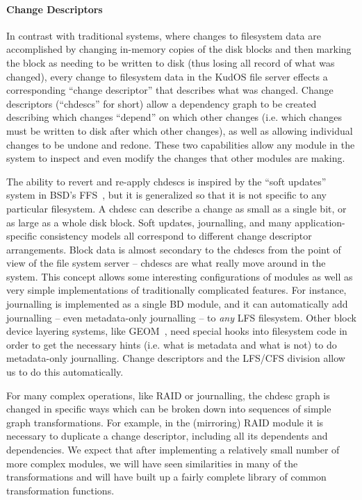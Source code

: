 \preparagraphspacing{}
\paragraph{Change Descriptors}
\label{sec:chdescs}

In contrast with traditional systems, where changes to filesystem data are
accomplished by changing in-memory copies of the disk blocks and then marking
the block as needing to be written to disk (thus losing all record of what was
changed), every change to filesystem data in the KudOS file server effects a
corresponding ``change descriptor'' that describes what was changed. Change
descriptors (``chdescs'' for short) allow a dependency graph to be created
describing which changes ``depend'' on which other changes (i.e. which changes
must be written to disk after which other changes), as well as allowing
individual changes to be undone and redone. These two capabilities allow any
module in the system to inspect and even modify the changes that other modules
are making.

The ability to revert and re-apply chdescs is inspired by the ``soft updates''
system in BSD's FFS~\cite{ganger00soft}, but it is generalized so that it is not
specific to any particular filesystem. A chdesc can describe a change as small
as a single bit, or as large as a whole disk block. Soft updates, journalling,
and many application-specific consistency models all correspond to different
change descriptor arrangements. Block data is almost secondary to the chdescs
from the point of view of the file system server -- chdescs are what really move
around in the system. This concept allows some interesting configurations of
modules as well as very simple implementations of traditionally complicated
features. For instance, journalling is implemented as a single BD module, and it
can automatically add journalling -- even metadata-only journalling -- to {\it
any} LFS filesystem. Other block device layering systems, like GEOM~\cite{geom},
need special hooks into filesystem code in order to get the necessary hints
(i.e. what is metadata and what is not) to do metadata-only journalling.
 Change descriptors and the LFS/CFS division allow us to
do this automatically.

For many complex operations, like RAID or journalling, the chdesc graph is
changed in specific ways which can be broken down into sequences of simple graph
transformations. For example, in the (mirroring) RAID module it is necessary to
duplicate a change descriptor, including all its dependents and dependencies. We
expect that after implementing a relatively small number of more complex
modules, we will have seen similarities in many of the transformations and will
have built up a fairly complete library of common transformation functions.
